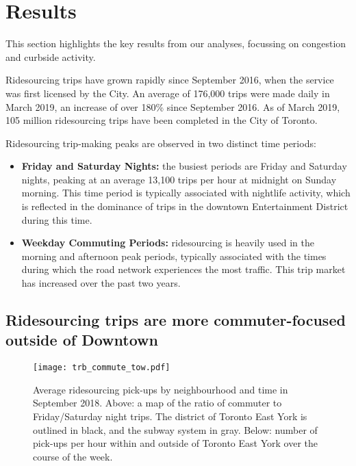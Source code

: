\documentclass[]{trbunofficial_bdit_final}
\begin{document}
\hypertarget{sec:results}{%
\section{Results}\label{sec:results}}

This section highlights the key results from our analyses, focussing on
congestion and curbside activity.

Ridesourcing trips have grown rapidly since September 2016, when the service
was first licensed by the City. An average of 176,000 trips were made daily in
March 2019, an increase of over 180\% since September 2016. As of March 2019,
105 million ridesourcing trips have been completed in the City of Toronto.

Ridesourcing trip-making peaks are observed in two distinct time periods:

\begin{itemize}
\tightlist
\item
  \textbf{Friday and Saturday Nights:} the busiest periods are Friday and Saturday
  nights, peaking at an average 13,100 trips per hour at midnight on Sunday
  morning. This time period is typically associated with nightlife activity,
  which is reflected in the dominance of trips in the downtown Entertainment
  District during this time.
\item
  \textbf{Weekday Commuting Periods:} ridesourcing is heavily used in the morning
  and afternoon peak periods, typically associated with the times during which
  the road network experiences the most traffic. This trip market has increased
  over the past two years.
\end{itemize}

\hypertarget{ridesourcing-trips-are-more-commuter-focused-outside-of-downtown}{%
\subsection{Ridesourcing trips are more commuter-focused outside of Downtown}\label{ridesourcing-trips-are-more-commuter-focused-outside-of-downtown}}

\begin{figure}
\centering
\texttt{[image: trb\_commute\_tow.pdf]}
\caption{Average ridesourcing pick-ups by neighbourhood and time in September 2018.
Above: a map of the ratio of commuter to Friday/Saturday night trips. The
district of Toronto East York is outlined in black, and the subway system in
gray. Below: number of pick-ups per hour within and outside of Toronto East
York over the course of the week. \label{fig:commtow}}
\end{figure}
\end{document}
